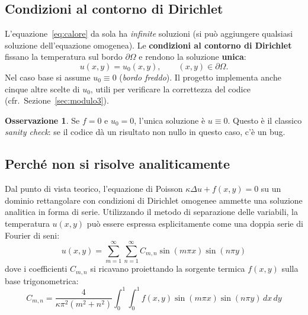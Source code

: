 \documentclass[a4paper,11pt]{article}
\theoremstyle{definition}
\newtheorem{osservazione}{Osservazione}[section]
\begin{document}
\subsection{Condizioni al contorno di Dirichlet}

L'equazione~\eqref{eq:calore} da sola ha \emph{infinite} soluzioni (si può aggiungere
qualsiasi soluzione dell'equazione omogenea). Le \textbf{condizioni al contorno di Dirichlet}
fissano la temperatura sul bordo $\partial\Omega$ e rendono la soluzione \textbf{unica}:
\[
  u(x,y) = u_0(x,y), \qquad (x,y) \in \partial\Omega.
\]
Nel caso base si assume $u_0 \equiv 0$ (\emph{bordo freddo}). Il progetto implementa anche
cinque altre scelte di $u_0$, utili per verificare la correttezza del codice (cfr.\
Sezione~\ref{sec:modulo3}).

\begin{osservazione}
Se $f = 0$ e $u_0 = 0$, l'unica soluzione è $u \equiv 0$. Questo è il classico
\emph{sanity check}: se il codice dà un risultato non nullo in questo caso, c'è un bug.
\end{osservazione}

\subsection{Perché non si risolve analiticamente}

Dal punto di vista teorico, l'equazione di Poisson $\kappa \Delta u + f(x,y) = 0$ su un dominio rettangolare con condizioni di Dirichlet omogenee ammette una soluzione analitica in forma di serie. Utilizzando il metodo di separazione delle variabili, la temperatura $u(x,y)$ può essere espressa esplicitamente come una doppia serie di Fourier di seni:
\begin{equation}
    u(x,y) = \sum_{m=1}^{\infty} \sum_{n=1}^{\infty} C_{m,n} \sin(m\pi x) \sin(n\pi y)
\end{equation}
dove i coefficienti $C_{m,n}$ si ricavano proiettando la sorgente termica $f(x,y)$ sulla base trigonometrica:
\begin{equation}
    C_{m,n} = \frac{4}{\kappa \pi^2 (m^2 + n^2)} \int_0^1 \int_0^1 f(x,y) \sin(m\pi x) \sin(n\pi y) \, dx \, dy
\end{equation}
\end{document}
